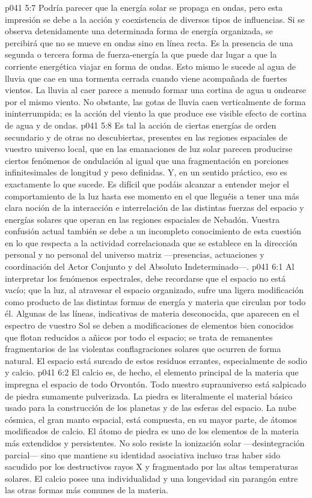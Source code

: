 \vs p041 5:7 \pc Podría parecer que la energía solar se propaga en ondas, pero esta impresión se debe a la acción y coexistencia de diversos tipos de influencias. Si se observa detenidamente una determinada forma de energía organizada, se percibirá que no se mueve en ondas sino en línea recta. Es la presencia de una segunda o tercera forma de fuerza\hyp{}energía la que puede dar lugar a que la corriente energética  viajar en forma de ondas. Esto mismo le sucede al agua de lluvia que cae en una tormenta cerrada cuando viene acompañada de fuertes vientos. La lluvia al caer parece a menudo formar una cortina de agua u ondearse por el mismo viento. No obstante, las gotas de lluvia caen verticalmente de forma ininterrumpida; es la acción del viento la que produce ese visible efecto de cortina de agua y de ondas.
\vs p041 5:8 Es tal la acción de ciertas energías de orden secundario y de otras no descubiertas, presentes en las regiones espaciales de vuestro universo local, que en las emanaciones de luz solar parecen producirse ciertos fenómenos de ondulación al igual que una fragmentación en porciones infinitesimales de longitud y peso definidas. Y, en un sentido práctico, eso es exactamente lo que sucede. Es difícil que podáis alcanzar a entender mejor el comportamiento de la luz hasta ese momento en el que lleguéis a tener una más clara noción de la interacción e interrelación de las distintas fuerzas del espacio y energías solares que operan en las regiones espaciales de Nebadón. Vuestra confusión actual también se debe a un incompleto conocimiento de esta cuestión en lo que respecta a la actividad correlacionada que se establece en la dirección personal y no personal del universo matriz ---presencias, actuaciones y coordinación del Actor Conjunto y del Absoluto Indeterminado---.
\vs p041 6:1 Al interpretar los fenómenos espectrales, debe recordarse que el espacio no está vacío; que la luz, al atravesar el espacio organizado, sufre una ligera modificación como producto de las distintas formas de energía y materia que circulan por todo él. Algunas de las líneas, indicativas de materia desconocida, que aparecen en el espectro de vuestro Sol se deben a modificaciones de elementos bien conocidos que flotan reducidos a añicos por todo el espacio; se trata de remanentes fragmentarios de las violentas conflagraciones solares que ocurren de forma natural. El espacio está surcado de estos residuos errantes, especialmente de sodio y calcio.
\vs p041 6:2 El calcio es, de hecho, el elemento principal de la materia que impregna el espacio de todo Orvontón. Todo nuestro suprauniverso está salpicado de piedra sumamente pulverizada. La piedra es literalmente el material básico usado para la construcción de los planetas y de las esferas del espacio. La nube cósmica, el gran manto espacial, está compuesta, en su mayor parte, de átomos modificados de calcio. El átomo de piedra es uno de los elementos de la materia más extendidos y persistentes. No solo resiste la ionización solar ---desintegración parcial--- sino que mantiene su identidad asociativa incluso tras haber sido sacudido por los destructivos rayos X y fragmentado por las altas temperaturas solares. El calcio posee una individualidad y una longevidad sin parangón entre las otras formas más comunes de la materia.
